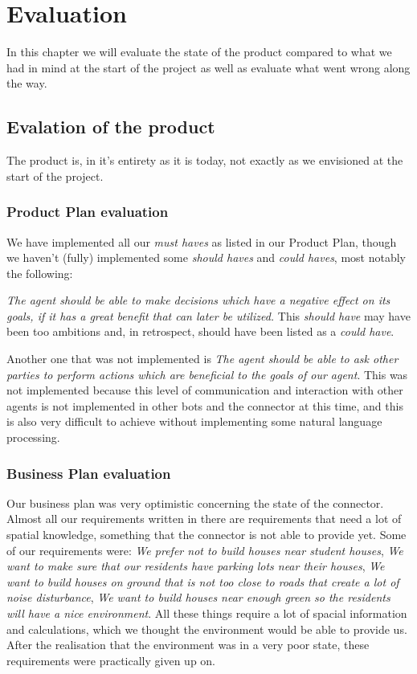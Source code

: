 \chapter{Evaluation}
In this chapter we will evaluate the state of the product compared to what we had in mind at the start of the project as well as evaluate what went wrong along the way.

\section{Evalation of the product}
The product is, in it's entirety as it is today, not exactly as we envisioned at the start of the project.

\subsection{Product Plan evaluation} We have implemented all our \emph{must haves} as listed in our Product Plan, though we haven't (fully) implemented some \emph{should haves} and \emph{could haves}, most notably the following:

\emph{The agent should be able to make decisions which have a negative effect on its goals, if it has a great benefit that can later be utilized.} This \emph{should have} may have been too ambitions and, in retrospect, should have been listed as a \emph{could have}.

Another one that was not implemented is \emph{The agent should be able to ask other parties to perform actions which are beneficial to the goals of our agent}. This was not implemented because this level of communication and interaction with other agents is not implemented in other bots and the connector at this time, and this is also very difficult to achieve without implementing some natural language processing.

\subsection{Business Plan evaluation} Our business plan was very optimistic concerning the state of the connector. Almost all our requirements written in there are requirements that need a lot of spatial knowledge, something that the connector is not able to provide yet. Some of our requirements were: \emph{We prefer not to build houses near student houses}, \emph{We want to make sure that our residents have parking lots near their houses}, \emph{We want to build houses on ground that is not too close to roads that create a lot of noise disturbance}, \emph{We want to build houses near enough green so the residents will have a nice environment}. All these things require a lot of spacial information and calculations, which we thought the environment would be able to provide us. After the realisation that the environment was in a very poor state, these requirements were practically given up on.

